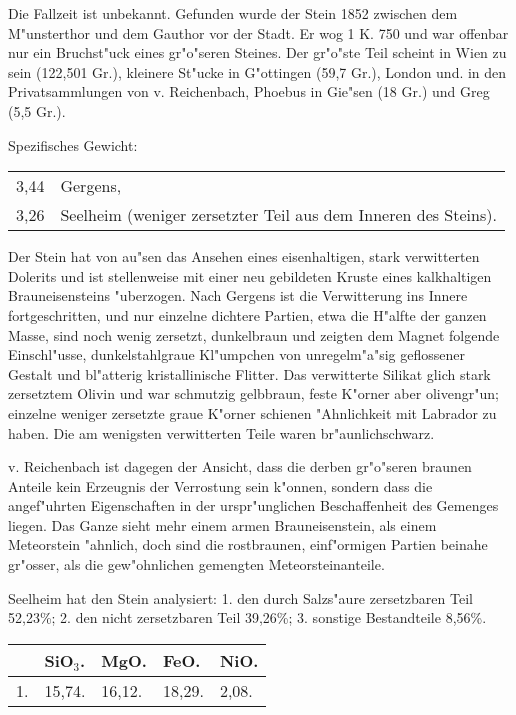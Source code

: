 \documentclass[a4paper, 11pt, oneside]{article}
\begin{document}
Die Fallzeit ist unbekannt. Gefunden wurde der Stein 1852 zwischen dem M"unsterthor und dem Gauthor vor der Stadt. Er wog 1 K. 750 und war offenbar nur ein Bruchst"uck eines gr"o"seren Steines. Der gr"o"ste Teil scheint in Wien zu sein (122,501 Gr.), kleinere St"ucke in G"ottingen (59,7 Gr.), London und. in den Privatsammlungen von v. Reichenbach, Phoebus in Gie"sen (18 Gr.) und Greg (5,5 Gr.).

Spezifisches Gewicht:  
\begin{table}[!ht]
    \centering\swabfamily\Large
    \begin{tabular}{l p{60mm}}
        3,44 & Gergens,\\
        3,26 & Seelheim (weniger zersetzter Teil aus dem Inneren des Steins).
    \end{tabular}
\end{table}

Der Stein hat von au"sen das Ansehen eines eisenhaltigen, stark verwitterten Dolerits und ist stellenweise mit einer neu gebildeten Kruste eines kalkhaltigen Brauneisensteins "uberzogen. Nach Gergens ist die Verwitterung ins Innere fortgeschritten, und nur einzelne dichtere Partien, etwa die H"alfte der ganzen Masse, sind noch wenig zersetzt, dunkelbraun und zeigten dem Magnet folgende Einschl"usse, dunkelstahlgraue Kl"umpchen von unregelm"a"sig geflossener Gestalt und bl"atterig kristallinische Flitter. Das verwitterte Silikat glich stark zersetztem Olivin und war schmutzig gelbbraun, feste K"orner aber olivengr"un; einzelne weniger zersetzte graue K"orner schienen "Ahnlichkeit mit Labrador zu haben. Die am wenigsten verwitterten Teile waren br"aunlichschwarz.

v. Reichenbach ist dagegen der Ansicht, dass die derben gr"o"seren braunen Anteile kein Erzeugnis der Verrostung sein k"onnen, sondern dass die angef"uhrten Eigenschaften in der urspr"unglichen Beschaffenheit des Gemenges liegen. Das Ganze sieht mehr einem armen Brauneisenstein, als einem Meteorstein "ahnlich, doch sind die rostbraunen, einf"ormigen Partien beinahe gr"osser, als die gew"ohnlichen gemengten Meteorsteinanteile.

Seelheim hat den Stein analysiert: 1. den durch Salzs"aure zersetzbaren Teil 52,23\%; 2. den nicht zersetzbaren Teil 39,26\%; 3. sonstige Bestandteile 8,56\%.
\begin{table}[H]
    \centering\swabfamily\Large
    \begin{tabular}{l l l l l}
        ~ & SiO$_{3}$. & MgO. & FeO. & NiO. \\ \hline
        1. & 15,74. & 16,12. & 18,29. & 2,08. \\
    \end{tabular}
\end{table}
\end{document}
